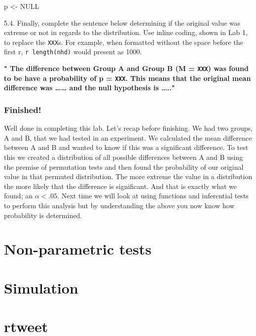 \documentclass[]{book}
\newenvironment{Shaded}{\begin{snugshade}}{\end{snugshade}}
\newcommand{\NormalTok}[1]{#1}
\newcommand{\OtherTok}[1]{\textcolor[rgb]{0.56,0.35,0.01}{#1}}
\newcommand{\StringTok}[1]{\textcolor[rgb]{0.31,0.60,0.02}{#1}}
\begin{document}
\begin{Shaded}
\begin{Highlighting}[]
\NormalTok{p <-}\StringTok{ }\OtherTok{NULL}
\end{Highlighting}
\end{Shaded}

5.4. Finally, complete the sentence below determining if the original value was extreme or not in regards to the distribution. Use inline coding, shown in Lab 1, to replace the \texttt{XXX}s. For example, when formatted without the space before the first r, \texttt{r\ length(nhd)} would present as 1000.

\textbf{" The difference between Group A and Group B (M = \texttt{XXX}) was found to be have a probability of p = \texttt{XXX}. This means that the original mean difference was \ldots{}\ldots{} and the null hypothesis is \ldots{}.." }

\hypertarget{finished-12}{%
\subsubsection{Finished!}\label{finished-12}}

Well done in completing this lab. Let's recap before finishing. We had two groups, A and B, that we had tested in an experiment. We calculated the mean difference between A and B and wanted to know if this was a significant difference. To test this we created a distribution of all possible differences between A and B using the premise of permutation tests and then found the probability of our original value in that permuted distribution. The more extreme the value in a distribution the more likely that the difference is significant. And that is exactly what we found; an \(\alpha < .05\). Next time we will look at using functions and inferential tests to perform this analysis but by understanding the above you now know how probability is determined.

\hypertarget{non-parametric-tests}{%
\section{Non-parametric tests}\label{non-parametric-tests}}

\hypertarget{simulation}{%
\section{Simulation}\label{simulation}}

\hypertarget{rtweet}{%
\section{rtweet}\label{rtweet}}
\end{document}
